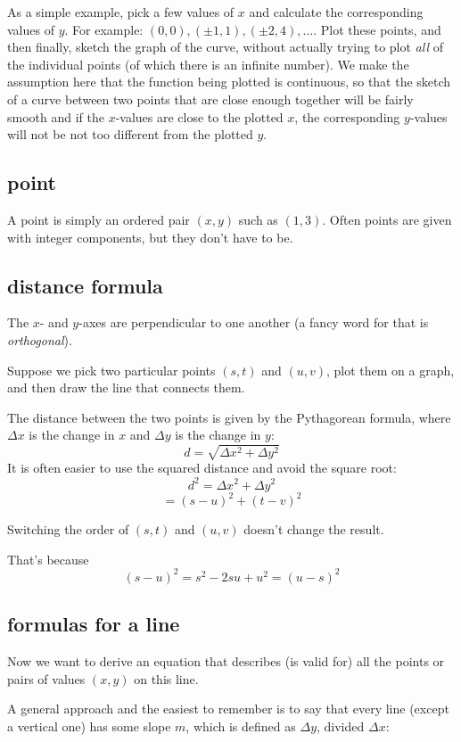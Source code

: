 \documentclass[11pt, oneside]{article}
\begin{document}
As a simple example, pick a few values of $x$ and calculate the corresponding values of $y$.  For example:  $(0,0), (\pm 1,1), (\pm 2, 4), \dots$.  Plot these points, and then finally, sketch the graph of the curve, without actually trying to plot \emph{all} of the individual points (of which there is an infinite number).  We make the assumption here that the function being plotted is continuous, so that the sketch of a curve between two points that are close enough together will be fairly smooth and if the $x$-values are close to the plotted $x$, the corresponding $y$-values will not be not too different from the plotted $y$.

\subsection*{point}
A point is simply an ordered pair $(x,y)$ such as $(1,3)$.  Often points are given with integer components, but they don't have to be.

\subsection*{distance formula}
The $x$- and $y$-axes are perpendicular to one another (a fancy word for that is \emph{orthogonal}).  

Suppose we pick two particular points $(s,t)$ and $(u,v)$, plot them on a graph, and then draw the line that connects them.

The distance between the two points is given by the Pythagorean formula, where $\Delta x$ is the change in $x$ and $\Delta y$ is the change in $y$:
\[ d = \sqrt{\Delta x^2 + \Delta y^2} \]
It is often easier to use the squared distance and avoid the square root:
\[ d^2 = \Delta x^2 + \Delta y^2 \]
\[ = (s-u)^2 + (t-v)^2 \]

Switching the order of $(s,t)$ and $(u,v)$ doesn't change the result.

That's because
\[ (s - u)^2 = s^2 - 2su + u^2 = (u - s)^2 \]

\subsection*{formulas for a line}
 
Now we want to derive an equation that describes (is valid for) all the points or pairs of values $(x,y)$ on this line.  

A general approach and the easiest to remember is to say that every line (except a vertical one) has some slope $m$, which is defined as $\Delta y$, divided $\Delta x$:
\end{document}
